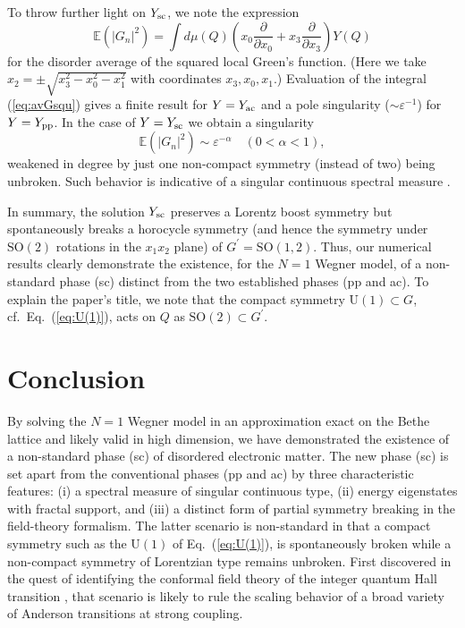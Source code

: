 \documentclass[aps,prl,twocolumn,letterpaper,superscriptaddress]{revtex4-2}
\begin{document}
To throw further light on $Y_{\rm sc}$, we note the expression
\begin{equation}\label{eq:avGsqu}
    \mathbb{E} (|G_n|^2) = \int d\mu(Q) \left( x_0 \frac{\partial}{\partial x_0} + x_3 \frac{\partial}{\partial x_3} \right) Y(Q)
\end{equation}
for the disorder average of the squared local Green's function. (Here we take $x_2 = \pm \sqrt{x_3^2 - x_0^2 - x_1^2}$ with coordinates
$x_3, x_0, x_1$.) Evaluation of the integral (\ref{eq:avGsqu}) gives a finite result for $Y = Y_{\rm ac}$ and a pole singularity ($\sim \varepsilon^{-1}$) for $Y = Y_{\rm pp}$. In the case of $Y = Y_{\rm sc}$ we obtain a singularity
\begin{equation}
    \mathbb{E} (|G_n|^2) \sim \varepsilon^{-\alpha} \quad (0 < \alpha < 1) ,
\end{equation}
weakened in degree by just one non-compact symmetry (instead of two) being unbroken. Such behavior is indicative of a singular continuous spectral measure \cite{AK2023}. 

In summary, the solution $Y_{\rm sc}$ preserves a Lorentz boost symmetry but spontaneously breaks a horocycle symmetry (and hence the symmetry under $\mathrm{SO}(2)$ rotations in the $x_1 x_2$ plane) of $G^\prime = \mathrm{SO}(1,2)$. Thus, our numerical results clearly demonstrate the existence, for the $N=1$ Wegner model, of a non-standard phase (sc) distinct from the two established phases (pp and ac). To explain the paper's title, we note that the compact symmetry $\mathrm{U}(1) \subset G$, cf.\ Eq.\ (\ref{eq:U(1)}), acts on $Q$ as $\mathrm{SO}(2) \subset G^\prime$.

\section{Conclusion}

By solving the $N=1$ Wegner model in an approximation exact on the Bethe lattice and likely valid in high dimension, we have demonstrated the existence of a non-standard phase (sc) of disordered electronic matter. The new phase (sc) is set apart from the conventional phases (pp and ac) by three characteristic features: (i) a spectral measure of singular continuous type, (ii) energy eigenstates with fractal support, and (iii) a distinct form of partial symmetry breaking in the field-theory formalism. The latter scenario is non-standard in that a compact symmetry such as the $\mathrm{U}(1)$ of Eq.\ (\ref{eq:U(1)}), is spontaneously broken while a non-compact symmetry of Lorentzian type remains unbroken. First discovered in the quest of identifying the conformal field theory of the integer quantum Hall transition \cite{CFT-IQHT}, that scenario is likely to rule the scaling behavior of a broad variety of Anderson transitions at strong coupling.
\end{document}
